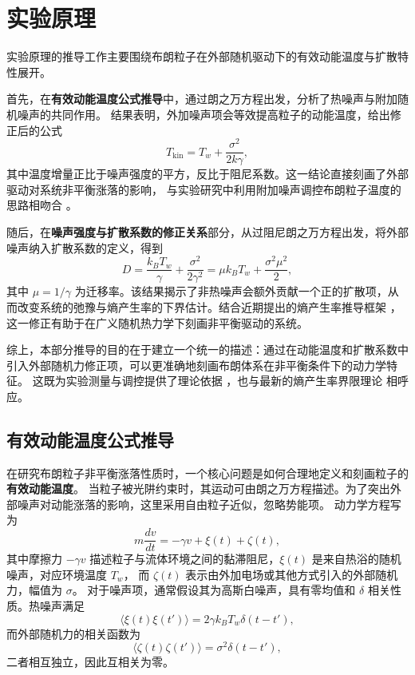 \documentclass[a4paper]{report} %
\begin{document}
\chapter{实验原理}
实验原理的推导工作主要围绕布朗粒子在外部随机驱动下的有效动能温度与扩散特性展开。\par
首先，在\textbf{有效动能温度公式推导}中，通过朗之万方程出发，分析了热噪声与附加随机噪声的共同作用。
结果表明，外加噪声项会等效提高粒子的动能温度，给出修正后的公式
\[
T_{\text{kin}} = T_w + \frac{\sigma^2}{2k\gamma},
\]
其中温度增量正比于噪声强度的平方，反比于阻尼系数。这一结论直接刻画了外部驱动对系统非平衡涨落的影响，
与实验研究中利用附加噪声调控布朗粒子温度的思路相吻合 \cite{Martinez2013,Roldan2014}。\par
随后，在\textbf{噪声强度与扩散系数的修正关系}部分，从过阻尼朗之万方程出发，将外部噪声纳入扩散系数的定义，得到
\[
D = \frac{k_B T_w}{\gamma} + \frac{\sigma^2}{2\gamma^2} = \mu k_B T_w + \frac{\sigma^2 \mu^2}{2},
\]
其中 $\mu = 1/\gamma$ 为迁移率。该结果揭示了非热噪声会额外贡献一个正的扩散项，从而改变系统的弛豫与熵产生率的下界估计。结合近期提出的熵产生率推导框架 \cite{Leighton2024}，
这一修正有助于在广义随机热力学下刻画非平衡驱动的系统。\par
综上，本部分推导的目的在于建立一个统一的描述：通过在动能温度和扩散系数中引入外部随机力修正项，可以更准确地刻画布朗体系在非平衡条件下的动力学特征。
这既为实验测量与调控提供了理论依据 \cite{Martinez2013,Roldan2014}，也与最新的熵产生率界限理论 \cite{Leighton2024} 相呼应。

\section{有效动能温度公式推导}

在研究布朗粒子非平衡涨落性质时，一个核心问题是如何合理地定义和刻画粒子的\textbf{有效动能温度}。
当粒子被光阱约束时，其运动可由朗之万方程描述。为了突出外部噪声对动能涨落的影响，这里采用自由粒子近似，忽略势能项。
动力学方程写为
\begin{equation}
m \frac{dv}{dt} = -\gamma v + \xi(t) + \zeta(t),
\end{equation}
其中摩擦力 $-\gamma v$ 描述粒子与流体环境之间的黏滞阻尼，$\xi(t)$ 是来自热浴的随机噪声，对应环境温度 $T_w$，
而 $\zeta(t)$ 表示由外加电场或其他方式引入的外部随机力，幅值为 $\sigma$。  
对于噪声项，通常假设其为高斯白噪声，具有零均值和 $\delta$ 相关性质。热噪声满足
\begin{equation}
\langle \xi(t) \xi(t') \rangle = 2\gamma k_B T_w \delta(t - t'),
\end{equation}
而外部随机力的相关函数为
\begin{equation}
\langle \zeta(t) \zeta(t') \rangle = \sigma^2 \delta(t - t'),
\end{equation}
二者相互独立，因此互相关为零。 \par 
\end{document}
